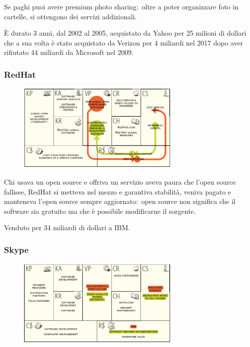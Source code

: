 Se paghi puoi avere premium photo sharing:\ oltre a poter organizzare foto in cartelle, si ottengono dei servizi addizionali.\

È durato 3 anni, dal 2002 al 2005, acquistato da Yahoo per 25 milioni di dollari che a sua volta è stato acquistato da Verizon per 4 miliardi nel 2017 dopo aver rifiutato 44 miliardi da Microsoft nel 2009.\

\subsubsection{RedHat}

\begin{figure}[H]
    \centering
    \includegraphics[width=0.7\textwidth]{immagini/RedHat.png}
\end{figure}
Chi usava un open source e offriva un servizio aveva paura che l'open source fallisse, RedHat si metteva nel mezzo e garantiva stabilità, veniva pagato e manteneva l'open source sempre aggiornato:\ open source non significa che il software sia gratuito ma che è possibile modificarne il sorgente.\

Venduto per 34 miliardi di dollari a IBM.\

\subsubsection{Skype}

\begin{figure}[H]
    \centering
    \includegraphics[width=0.7\textwidth]{immagini/Skype.png}
\end{figure}

